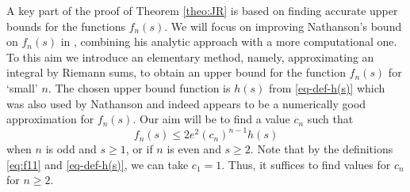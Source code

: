 \documentclass[12pt]{amsart}
\begin{document}
A key part of the proof of Theorem \ref{theo:JR} is based on finding accurate upper bounds for the functions $f_n(s)$. We will focus on improving Nathanson's bound on $f_n(s)$ in \cite[Chapter 9]{Nathanson}, combining his analytic approach with a more computational one.
To this aim we introduce an elementary method, namely, approximating an integral by Riemann sums, to obtain an upper bound for the function $f_n(s)$ for `small' $n$. The chosen upper bound function is $h(s)$ from \eqref{eq-def-h(s)} which was also used by Nathanson and indeed appears to be a numerically good approximation for $f_n(s)$. Our aim will be to find a value $c_n$ such that 
\begin{equation}
\label{eq:fh}
    f_n(s)\le 2e^2 (c_n)^{n-1}h(s)
\end{equation}
when $n$ is odd and $s\ge 1$, or if $n$ is even and $s\ge 2$. Note that by the definitions \eqref{eq:f11} and \eqref{eq-def-h(s)}, we can take $c_1=1$. Thus, it suffices to find values for $c_n$ for $n\ge 2$.
\end{document}

